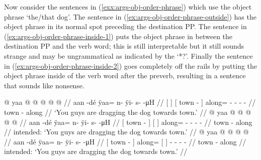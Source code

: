 Now consider the sentences in (\ref{exx:args-obj-order-phrase}) which use the object phrase  ‘the/that dog’.
The sentence in (\ref{ex:args-obj-order-phrase-outside}) has the object phrase in its normal spot preceding the destination PP.
The sentence in (\ref{ex:args-obj-order-phrase-inside-1}) puts the object phrase in between the destination PP and the verb word; this is still interpretable but it still sounds strange and may be ungrammatical as indicated by the ‘*?’.
Finally the sentence in (\ref{ex:args-obj-order-phrase-inside-2}) goes completely off the rails by putting the object phrase inside of the verb word after the preverb, resulting in a sentence that sounds like nonsense.

\pex\label{exx:args-obj-order-phrase}%
\a\label{ex:args-obj-order-phrase-outside}%
%
\begingl
	\gla	{}   {} {}  @ {} {} yaa @  @ {} @ {} @ {} @ {} //
	\glb	{}   {} {} aan -dé {} ÿaa= n- ÿi- s-  -μH //
	\glc	{}[   {}] {}[ town - {}]
			along= - - -  - //
	\gld	{}   {} {} town - {} along  {} {} {} {} {} //
	\glft	‘You guys are dragging the dog towards town.’
		//
\endgl
\a\label{ex:args-obj-order-phrase-inside-1}%
%
%
\begingl
	\gla	{}  @ {} {} {}   {} yaa @  @ {} @ {} @ {} @ {} //
	\glb	{} aan -dé {} {}   {} ÿaa= n- ÿi- s-  -μH //
	\glc	{}[ town - {}] {}[   {}]
			along= - - -  - //
	\gld	{} town - {} {}   {} along  {} {} {} {} {} //
	\glft	intended: ‘You guys are dragging the dog towards town.’
		//
\endgl
\a\label{ex:args-obj-order-phrase-inside-2}%
\ljudge{*}%
%
\begingl
	\gla	{}  @ {} {} yaa {}   {}  @ {} @ {} @ {} @ {} //
	\glb	{} aan -dé {} ÿaa= {}   {} n- ÿi- s-  -μH //
	\glc	{}[ town - {}] along= {}[   {}]
			 - - -  - //
	\gld	{} town - {} along {}   {}  {} {} {} {} {} //
	\glft	intended: ‘You guys are dragging the dog towards town.’
		//
\endgl
\xe

